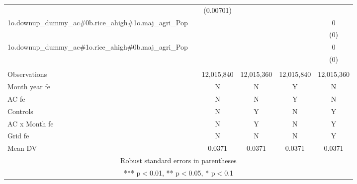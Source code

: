 \documentclass[]{article}
\begin{document}
\begin{tabular}{lccccc}
 &  & (0.00701) &  &  &  \\
1o.downup\_dummy\_ac\#0b.rice\_ahigh\#1o.maj\_agri\_Pop &  &  &  &  & 0 \\
 &  &  &  &  & (0) \\
1o.downup\_dummy\_ac\#1o.rice\_ahigh\#0b.maj\_agri\_Pop &  &  &  &  & 0 \\
 &  &  &  &  & (0) \\
 &  &  &  &  &  \\
Observations &  & 12,015,840 & 12,015,360 & 12,015,840 & 12,015,360 \\
Month year fe &  & N & N & Y & N \\
AC fe &  & N & N & Y & N \\
Controls &  & N & Y & N & Y \\
AC x Month fe &  & N & Y & N & Y \\
Grid fe &  & N & N & N & Y \\
 Mean DV &  & 0.0371 & 0.0371 & 0.0371 & 0.0371 \\ \hline
\multicolumn{6}{c}{ Robust standard errors in parentheses} \\
\multicolumn{6}{c}{ *** p$<$0.01, ** p$<$0.05, * p$<$0.1} \\
\end{tabular}
\end{document}
